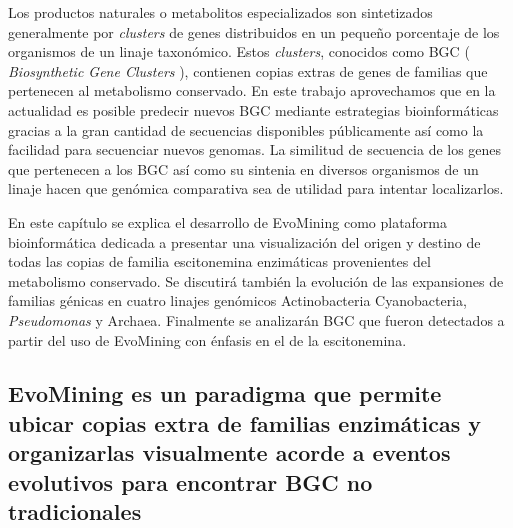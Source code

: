 \documentclass[12pt,twoside]{reedthesis}
\begin{document}
  Los productos naturales o metabolitos especializados son sintetizados
  generalmente por \emph{clusters} de genes distribuidos en un pequeño
  porcentaje de los organismos de un linaje taxonómico. Estos
  \emph{clusters}, conocidos como BGC ( \emph{Biosynthetic Gene Clusters}
  ), contienen copias extras de genes de familias que pertenecen al
  metabolismo conservado. En este trabajo aprovechamos que en la
  actualidad es posible predecir nuevos BGC mediante estrategias
  bioinformáticas gracias a la gran cantidad de secuencias disponibles
  públicamente así como la facilidad para secuenciar nuevos genomas. La
  similitud de secuencia de los genes que pertenecen a los BGC así como su
  sintenia en diversos organismos de un linaje hacen que genómica
  comparativa sea de utilidad para intentar localizarlos.
  
  En este capítulo se explica el desarrollo de EvoMining como plataforma
  bioinformática dedicada a presentar una visualización del origen y
  destino de todas las copias de familia escitonemina enzimáticas
  provenientes del metabolismo conservado. Se discutirá también la
  evolución de las expansiones de familias génicas en cuatro linajes
  genómicos Actinobacteria Cyanobacteria, \emph{Pseudomonas} y Archaea.
  Finalmente se analizarán BGC que fueron detectados a partir del uso de
  EvoMining con énfasis en el de la escitonemina.
  
  \subsection{EvoMining es un paradigma que permite ubicar copias extra de
  familias enzimáticas y organizarlas visualmente acorde a eventos
  evolutivos para encontrar BGC no
  tradicionales}\label{evomining-es-un-paradigma-que-permite-ubicar-copias-extra-de-familias-enzimaticas-y-organizarlas-visualmente-acorde-a-eventos-evolutivos-para-encontrar-bgc-no-tradicionales}
  
\end{document}

